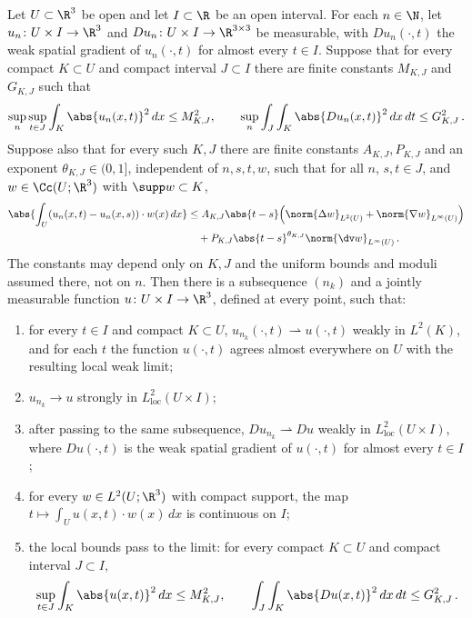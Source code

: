 \documentclass[11pt,reqno]{amsart}
\begin{document}
\begin{lemma}\label{lem:compactness}
Let $U\subset\R^3$ be open and let $I\subset\R$ be an open interval. For each $n\in\N$, let $u_n\colon U\times I\to\R^3$ and $Du_n\colon U\times I\to\R^{3\times3}$ be measurable, with $Du_n(\cdot,t)$ the weak spatial gradient of $u_n(\cdot,t)$ for almost every $t\in I$. Suppose that for every compact $K\subset U$ and compact interval $J\subset I$ there are finite constants $M_{K,J}$ and $G_{K,J}$ such that
\begin{equation*}
\sup_n\sup_{t\in J}\int_K\abs{u_n(x,t)}^2\,dx\le M_{K,J}^2,
\qquad
\sup_n\int_J\int_K\abs{Du_n(x,t)}^2\,dx\,dt\le G_{K,J}^2\,.
\end{equation*}
Suppose also that for every such $K,J$ there are finite constants $A_{K,J},P_{K,J}$ and an exponent $\theta_{K,J}\in(0,1]$, independent of $n,s,t,w$, such that for all $n$, $s,t\in J$, and $w\in\Cc(U;\R^3)$ with $\supp w\subset K$,
\begin{align*}
\abs{\int_U (u_n(x,t)-u_n(x,s))\cdot w(x)\,dx}
&\le A_{K,J}\abs{t-s}\Bigl(\norm{\Delta w}_{L^2(U)}+\norm{\nabla w}_{L^\infty(U)}\Bigr)\\
&\quad+P_{K,J}\abs{t-s}^{\theta_{K,J}}\norm{\dv w}_{L^\infty(U)}\,.
\end{align*}
The constants may depend only on $K,J$ and the uniform bounds and moduli assumed there, not on $n$. Then there is a subsequence $(n_k)$ and a jointly measurable function $u\colon U\times I\to\R^3$, defined at every point, such that:
\begin{enumerate}[label=(\alph*)]
\item for every $t\in I$ and compact $K\subset U$, $u_{n_k}(\cdot,t)\rightharpoonup u(\cdot,t)$ weakly in $L^2(K)$, and for each $t$ the function $u(\cdot,t)$ agrees almost everywhere on $U$ with the resulting local weak limit;
\item $u_{n_k}\to u$ strongly in $L^2_{\mathrm{loc}}(U\times I)$;
\item after passing to the same subsequence, $Du_{n_k}\rightharpoonup Du$ weakly in $L^2_{\mathrm{loc}}(U\times I)$, where $Du(\cdot,t)$ is the weak spatial gradient of $u(\cdot,t)$ for almost every $t\in I$;
\item for every $w\in L^2(U;\R^3)$ with compact support, the map $t\mapsto\int_Uu(x,t)\cdot w(x)\,dx$ is continuous on $I$;
\item the local bounds pass to the limit: for every compact $K\subset U$ and compact interval $J\subset I$,
\begin{equation*}
\sup_{t\in J}\int_K\abs{u(x,t)}^2\,dx\le M_{K,J}^2,
\qquad
\int_J\int_K\abs{Du(x,t)}^2\,dx\,dt\le G_{K,J}^2\,.
\end{equation*}
\end{enumerate}
\end{lemma}
\end{document}
